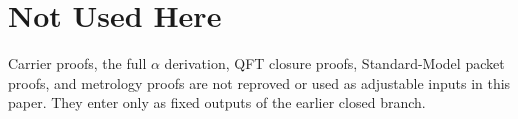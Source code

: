 \section{Not Used Here}

Carrier proofs, the full $\alpha$ derivation, QFT closure proofs, Standard-Model packet proofs,
and metrology proofs are not reproved or used as adjustable inputs in this paper. They enter only
as fixed outputs of the earlier closed branch.

\clearpage



